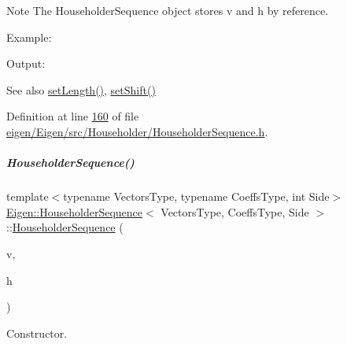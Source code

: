\begin{DoxyNote}{Note}
The Householder\+Sequence object stores {\ttfamily v} and {\ttfamily h} by reference.
\end{DoxyNote}
Example\+: 
\begin{DoxyCodeInclude}
\end{DoxyCodeInclude}
 Output\+: 
\begin{DoxyVerbInclude}
\end{DoxyVerbInclude}


\begin{DoxySeeAlso}{See also}
\hyperlink{group___householder___module_a30cc06d5b2ca4b7dcf5fcd53313d25fc}{set\+Length()}, \hyperlink{group___householder___module_a2d8d996ce1085fd977850988735739f0}{set\+Shift()} 
\end{DoxySeeAlso}


Definition at line \hyperlink{eigen_2_eigen_2src_2_householder_2_householder_sequence_8h_source_l00160}{160} of file \hyperlink{eigen_2_eigen_2src_2_householder_2_householder_sequence_8h_source}{eigen/\+Eigen/src/\+Householder/\+Householder\+Sequence.\+h}.

\mbox{\label{group___householder___module_af6aeede87ed8dac452f4fa8b4f45c3f2}} 
\subparagraph{\texorpdfstring{Householder\+Sequence()}{HouseholderSequence()}\hspace{0.1cm}{\footnotesize\ttfamily [2/2]}}
{\footnotesize\ttfamily template$<$typename Vectors\+Type, typename Coeffs\+Type, int Side$>$ \\
\hyperlink{group___householder___module_class_eigen_1_1_householder_sequence}{Eigen\+::\+Householder\+Sequence}$<$ Vectors\+Type, Coeffs\+Type, Side $>$\+::\hyperlink{group___householder___module_class_eigen_1_1_householder_sequence}{Householder\+Sequence} (\begin{DoxyParamCaption}\item[{const Vectors\+Type \&}]{v,  }\item[{const Coeffs\+Type \&}]{h }\end{DoxyParamCaption})\hspace{0.3cm}{\ttfamily [inline]}}



Constructor. 


